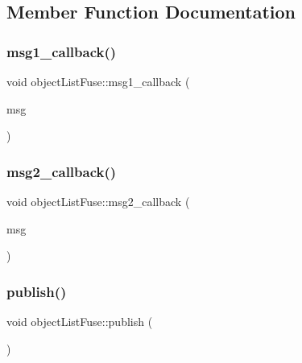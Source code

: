\subsection{Member Function Documentation}
\mbox{\label{classobjectListFuse_afa2b86593e97dbc3ffd64df68fb5c3e8}} 
\subsubsection{\texorpdfstring{msg1\+\_\+callback()}{msg1\_callback()}}
{\footnotesize\ttfamily void object\+List\+Fuse\+::msg1\+\_\+callback (\begin{DoxyParamCaption}\item[{autoware\+\_\+msgs\+::\+Detected\+Object\+Array}]{msg }\end{DoxyParamCaption})\hspace{0.3cm}{\ttfamily [inline]}}

\mbox{\label{classobjectListFuse_a27a847b9b2d85a7b538af88b602cbbfa}} 
\subsubsection{\texorpdfstring{msg2\+\_\+callback()}{msg2\_callback()}}
{\footnotesize\ttfamily void object\+List\+Fuse\+::msg2\+\_\+callback (\begin{DoxyParamCaption}\item[{autoware\+\_\+msgs\+::\+Detected\+Object\+Array}]{msg }\end{DoxyParamCaption})\hspace{0.3cm}{\ttfamily [inline]}}

\mbox{\label{classobjectListFuse_af0877c42836c4faf8b474754c82a8cd4}} 
\subsubsection{\texorpdfstring{publish()}{publish()}}
{\footnotesize\ttfamily void object\+List\+Fuse\+::publish (\begin{DoxyParamCaption}{ }\end{DoxyParamCaption})\hspace{0.3cm}{\ttfamily [inline]}}

